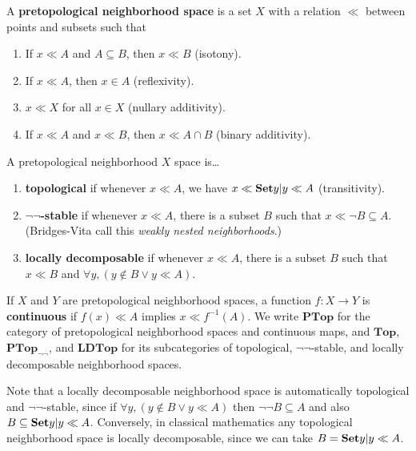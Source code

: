 \documentclass{article}
\def\cpl#1{\neg #1}
\def\inv{^{-1}}
\def\nn{\ensuremath{\neg\neg}}
\def\PTop{\mathbf{PTop}}
\def\Top{\mathbf{Top}}
\def\PTopnn{\mathbf{PTop}_{\nn}}
\def\LDTop{\mathbf{LDTop}}
\begin{document}
\begin{defn}
  A \textbf{pretopological neighborhood space} is a set $X$ with a relation $\ll$ between points and subsets such that
  \begin{enumerate}
  \item If $x\ll A$ and $A\subseteq B$, then $x\ll B$ (isotony).
  \item If $x\ll A$, then $x\in A$ (reflexivity).
  \item $x\ll X$ for all $x\in X$ (nullary additivity).
  \item If $x\ll A$ and $x\ll B$, then $x\ll A\cap B$ (binary additivity).
  \end{enumerate}
  A pretopological neighborhood $X$ space is\dots
  \begin{enumerate}[resume]
  \item \textbf{topological} if whenever $x\ll A$, we have $x \ll \setof{ y | y\ll A}$ (transitivity).
  \item \textbf{\nn-stable} if whenever $x\ll A$, there is a subset $B$ such that $x\ll \cpl{B} \subseteq A$.
    (Bridges-Vita call this \emph{weakly nested neighborhoods}.)
  \item \textbf{locally decomposable} if whenever $x\ll A$, there is a subset $B$ such that $x\ll B$ and $\forall y, (y\notin B \lor y \ll A)$.
  \end{enumerate}
  If $X$ and $Y$ are pretopological neighborhood spaces, a function $f:X\to Y$ is \textbf{continuous} if $f(x)\ll A$ implies $x\ll f\inv(A)$.
  We write $\PTop$ for the category of pretopological neighborhood spaces and continuous maps, and $\Top$, $\PTopnn$, and $\LDTop$ for its subcategories of topological, \nn-stable, and locally decomposable neighborhood spaces.
\end{defn}

Note that a locally decomposable neighborhood space is automatically topological and \nn-stable, since if $\forall y, (y\notin B \lor y \ll A)$ then $\neg\neg B \subseteq A$ and also $B \subseteq \setof{ y | y\ll A}$.
Conversely, in classical mathematics any topological neighborhood space is locally decomposable, since we can take $B = \setof{ y | y\ll A}$.
\end{document}
